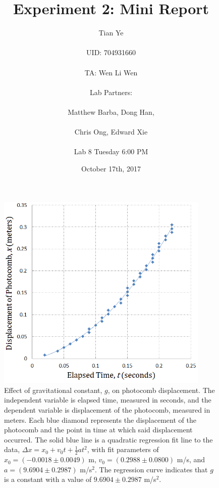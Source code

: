 \documentclass[titlepage]{article}
\begin{document}
\title{Experiment 2: Mini Report}
\author{Tian Ye \\ \\ UID: 704931660 \\ \\ TA: Wen Li Wen \\ \\ Lab Partners: \\ \\ Matthew Barba, Dong Han,\\ \\ Chris Ong, Edward Xie \\ \\ Lab 8 Tuesday 6:00 PM}
\date{October 17th, 2017}

\maketitle

\begin{figure}[!htbp]
    \centering
    \includegraphics[width=4.0in]{Figure.png}
    \caption{Effect of gravitational constant, $g$, on photocomb displacement. The independent variable is elapsed time, measured in seconds, and the dependent variable is displacement of the photocomb, measured in meters. Each blue diamond represents the displacement of the photocomb and the point in time at which said displacement occurred. The solid blue line is a quadratic regression fit line to the data, $\Delta x = x_0 + v_0t + \frac{1}{2}at^2$, with fit parameters of $x_0 = (-0.0018 \pm 0.0049)$ m, $v_0 = (0.2988 \pm 0.0800)$ m/s, and $a = (9.6904 \pm 0.2987)$ m/s$^2$. The regression curve indicates that $g$ is a constant with a value of $9.6904 \pm 0.2987$ m/s$^2$.}
\end{figure}
\end{document}
